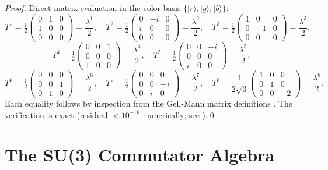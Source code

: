 \documentclass[11pt,a4paper]{article}
\newcommand{\ket}[1]{|#1\rangle}
\begin{document}
\begin{proof}
Direct matrix evaluation in the color basis
$\{\ket{r}, \ket{g}, \ket{b}\}$:
\[
T^1 = \tfrac{1}{2}\begin{pmatrix}0&1&0\\1&0&0\\0&0&0\end{pmatrix}
= \frac{\lambda^1}{2},\quad
T^2 = \tfrac{1}{2}\begin{pmatrix}0&-i&0\\i&0&0\\0&0&0\end{pmatrix}
= \frac{\lambda^2}{2},\quad
T^3 = \tfrac{1}{2}\begin{pmatrix}1&0&0\\0&{-1}&0\\0&0&0\end{pmatrix}
= \frac{\lambda^3}{2},
\]
\[
T^4 = \tfrac{1}{2}\begin{pmatrix}0&0&1\\0&0&0\\1&0&0\end{pmatrix}
= \frac{\lambda^4}{2},\quad
T^5 = \tfrac{1}{2}\begin{pmatrix}0&0&{-i}\\0&0&0\\i&0&0\end{pmatrix}
= \frac{\lambda^5}{2},
\]
\[
T^6 = \tfrac{1}{2}\begin{pmatrix}0&0&0\\0&0&1\\0&1&0\end{pmatrix}
= \frac{\lambda^6}{2},\quad
T^7 = \tfrac{1}{2}\begin{pmatrix}0&0&0\\0&0&{-i}\\0&i&0\end{pmatrix}
= \frac{\lambda^7}{2},\quad
T^8 = \frac{1}{2\sqrt{3}}\begin{pmatrix}1&0&0\\0&1&0\\0&0&{-2}\end{pmatrix}
= \frac{\lambda^8}{2}.
\]
Each equality follows by inspection from the Gell-Mann matrix
definitions \citep{gell-mann1962}.  The verification is exact
(residual $< 10^{-16}$ numerically; see \citep{cpp_ss_mc}).\qed
\end{proof}

\section{The SU(3) Commutator Algebra}
\end{document}
